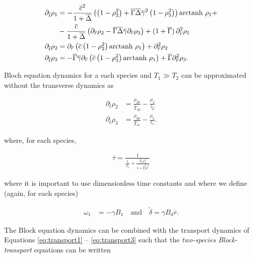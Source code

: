 \documentclass[%
oneside,                 %
final,                   %
10pt]{article}
\begin{document}
\begin{align} 
	\partial_{\overline{t}} \rho_1 
	&=
	-\frac{\overline{c}^2}{1+\overline{\Delta}}
	\left(
		\left(
			1 - \rho_2^2
		\right)
		+
		\overline{\Gamma}\overline{\Delta}\overline{\gamma}^2
		\left(
			1 - \rho_3^2
		\right)
	\right)
	\text{arctanh }\rho_1 + 
	\nonumber\\
	&-\frac{\overline{c}}{1+\overline{\Delta}}
	\left(
		\partial_{\overline{r}} \rho_2 - \overline{\Gamma}\overline{\Delta}\overline{\gamma} \partial_{\overline{r}} \rho_3
	\right)
	+ ( 1 + \overline{\Gamma} )\, \partial_{\overline{r}}^2 \rho_1
	\label{eq:transport1} \\
	\partial_{\overline{t}} \rho_2 
	&=
	\partial_{\overline{r}}
	\left(
		\overline{c}
		\left( 1 - \rho_2^2 \right)
		\text{arctanh }\rho_1
	\right)
	+ \partial_{\overline{r}}^2 \rho_2
	\label{eq:transport2} \\
	\partial_{\overline{t}} \rho_3
	&=
	- 
	\overline{\Gamma}\overline{\gamma}
	\partial_{\overline{r}}
	\left(
		\overline{c}
		\left( 1 - \rho_3^2 \right)
		\text{arctanh }\rho_1
	\right)
	+ \overline{\Gamma} \partial_{\overline{r}}^2 \rho_3 .
	\label{eq:transport3}
\end{align}

Bloch equation dynamics for a each species and $T_1 \gg T_2$ can be approximated without the transverse dynamics as \cite{Picone2010,Grivet1993}

\begin{align}
	\partial_{\overline{t}} \rho_2 &= \frac{\rho_{20}}{\overline{T}_{1p}} - \frac{\rho_2}{\overline{\tau}_p} \\
	\partial_{\overline{t}} \rho_3 &= \frac{\rho_{30}}{\overline{T}_{1e}} - \frac{\rho_3}{\overline{\tau}_e}.
\end{align}

where, for each species,

\begin{align}
	\overline{\tau} = \frac{1}{\frac{1}{\overline{T}_1} + \frac{\overline{T}_2 \omega_1^2}{1+\overline{T}_2^2 \tilde{\delta}^2}}
\end{align}

where it is important to use dimensionless time constants and where we define (again, for each species)

\begin{align}
	\omega_1 &= -\gamma B_1 \quad \text{and} \quad
	\tilde{\delta} = \gamma B_d \overline{r}.
\end{align}

The Block equation dynamics can be combined with the transport dynamics of Equations \ref{eq:transport1} -- \ref{eq:transport3} such that the \emph{two-species Block-transport} equations can be written
\end{document}
